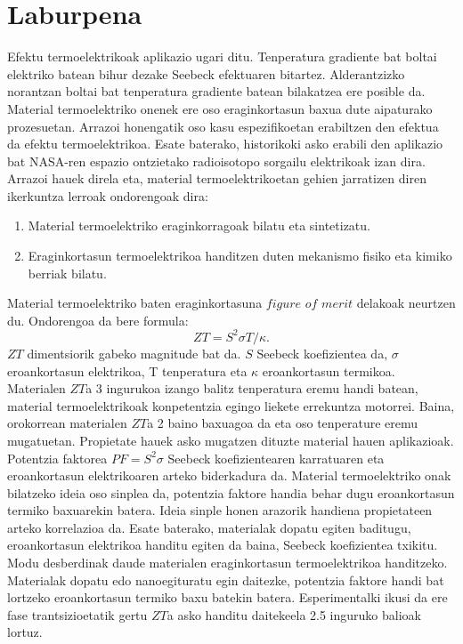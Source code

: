 
\chapter*{Laburpena} %

Efektu termoelektrikoak aplikazio ugari ditu. Tenperatura gradiente bat boltai elektriko batean bihur dezake Seebeck 
efektuaren bitartez. Alderantzizko norantzan boltai bat tenperatura gradiente batean bilakatzea ere posible da. 
Material termoelektriko onenek ere oso eraginkortasun baxua dute aipaturako prozesuetan. Arrazoi honengatik oso kasu 
espezifikoetan erabiltzen den efektua da efektu termoelektrikoa. Esate baterako, historikoki asko erabili den 
aplikazio bat NASA-ren espazio ontzietako radioisotopo sorgailu elektrikoak izan dira. Arrazoi hauek direla eta, 
material termoelektrikoetan gehien jarratizen diren ikerkuntza lerroak ondorengoak dira:
\begin{enumerate}
\item Material termoelektriko eraginkorragoak bilatu eta sintetizatu.
\item Eraginkortasun termoelektrikoa handitzen duten mekanismo fisiko eta kimiko berriak bilatu. 
\end{enumerate}
Material termoelektriko baten eraginkortasuna $figure$ $of$ $merit$ delakoak neurtzen du. Ondorengoa da bere formula:
\begin{equation}
\nonumber
ZT=S^{2}\sigma T/\kappa.
\end{equation}
$ZT$ dimentsiorik gabeko magnitude bat da. $S$ Seebeck koefizientea da, $\sigma$ eroankortasun elektrikoa, T 
tenperatura eta $\kappa$ eroankortasun termikoa. Materialen $ZT$a 3 ingurukoa izango balitz tenperatura eremu handi 
batean, material termoelektrikoak konpetentzia egingo liekete errekuntza motorrei. Baina, orokorrean materialen $ZT$a 
2 baino baxuagoa da eta oso tenperature eremu mugatuetan. Propietate hauek asko mugatzen dituzte material hauen 
aplikazioak. \\

Potentzia faktorea $PF=S^{2}\sigma$ Seebeck koefizientearen karratuaren eta eroankortasun elektrikoaren arteko
biderkadura da. Material termoelektriko onak bilatzeko ideia oso sinplea da, potentzia faktore handia behar dugu 
eroankortasun termiko baxuarekin batera. Ideia sinple honen arazorik handiena propietateen arteko korrelazioa da. 
Esate baterako, materialak dopatu egiten baditugu, eroankortasun elektrikoa handitu egiten da baina, Seebeck 
koefizientea txikitu. \\

Modu desberdinak daude materialen eraginkortasun termoelektrikoa handitzeko. Materialak dopatu edo nanoegituratu 
egin daitezke, potentzia faktore handi bat lortzeko eroankortasun termiko baxu batekin batera. Esperimentalki ikusi 
da ere fase trantsizioetatik gertu $ZT$a asko handitu daitekeela 2.5 inguruko balioak lortuz. 
